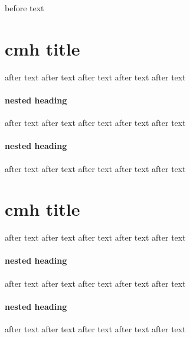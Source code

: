 before text

\section{cmh title}
after text
after text
after text
after text
after text

\paragraph{nested heading}

after text
after text
after text
after text
after text

\paragraph{nested heading}

after text
after text
after text
after text
after text

\section{cmh title}

after text
after text
after text
after text
after text

\paragraph{nested heading}

after text
after text
after text
after text
after text

\paragraph{nested heading}
after text
after text
after text
after text
after text

